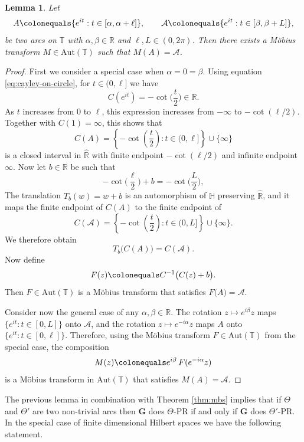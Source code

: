 \documentclass[reqno,a4paper,11pt]{amsart}
\numberwithin{equation}{section}
\newtheorem{lemma}[definition]{Lemma}
\def\R{{\mathbb R}}
\def\T{{\mathbb T}}
\newcommand\1{\mathds{1}}
\begin{document}
\begin{lemma}\label{lma:arc_bijection}
    Let
    $$
      A \colonequals \{ e^{it} : t \in [\alpha, \alpha + \ell] \}, 
      \qquad 
      \mathcal{A} \colonequals \{ e^{it} : t \in [\beta, \beta + L] \},
    $$
    be two arcs on $\T$ with $\alpha,\beta \in \R$ and $\ell,L \in (0,2\pi)$. Then there exists a Möbius transform $M\in\mathrm{Aut}(\T)$ such that $M(A)=\mathcal{A}$.
\end{lemma}
\begin{proof}
First we consider a special case when $\alpha=0=\beta$.
Using equation \eqref{eq:cayley-on-circle}, for $t\in(0,\ell]$ we have
$$
  C(e^{it}) = -\cot\Big(\frac{t}{2}\Big) \in \R.
$$
As $t$ increases from $0$ to $\ell$, this expression increases from $-\infty$ to $-\cot(\ell/2)$. Together with $C(1)=\infty$, this shows that
$$
  C(A)
  = \left \{ -\cot\left (\frac{t}{2} \right ) : t\in(0,\ell] \right \} \cup \{\infty\}
$$
is a closed interval in $\hat \R$ with finite endpoint $-\cot(\ell/2)$ and infinite endpoint $\infty$.
Now let $b\in\R$ be such that
$$
  -\cot\Big(\frac{\ell}{2}\Big) + b = -\cot\Big(\frac{L}{2}\Big),
$$
The translation $T_b(w) = w + b$ is an automorphism of $\mathbb H$ preserving $\hat \R$, and it maps the finite endpoint of $C(A)$ to the finite endpoint of
$$
  C(\mathcal{A})
  = \left \{ -\cot\left (\frac{t}{2} \right ) : t\in(0,L] \right \} \cup \{\infty\}.
$$
We therefore obtain
$$
  T_b\bigl(C(A)\bigr)
  = C(\mathcal{A}).
$$
Now define
$$
  F(z) \colonequals C^{-1}\bigl(C(z) + b\bigr).
$$
Then $F\in \text{Aut}(\T)$ is a Möbius transform that satisfies $F\bigl(A\bigr)=\mathcal{A}$.

Consider now the general case of any $\alpha,\beta\in \R$. The rotation $z\mapsto e^{i\beta}z$ maps $\{e^{it}:t\in[0,L]\}$ onto $\mathcal A$, and the rotation $z\mapsto e^{-i\alpha}z$ maps $A$ onto $\{e^{it}: t\in [0,\ell]\}$. Therefore, using the Möbius transform $F\in \text{Aut}(\T)$ from the special case, the composition
$$
  M(z) \colonequals e^{i\beta}\,F(e^{-i\alpha}z)
$$
is a Möbius transform in $\mathrm{Aut}(\T)$ that satisfies
$
  M(A) = \mathcal A.
$
\end{proof}

The previous lemma in combination with Theorem \ref{thm:mbs} implies that if $\Theta$ and $\Theta'$ are two non-trivial arcs then $\mathbf{G}$ does $\Theta$-PR if and only if $\mathbf{G}$ does $\Theta'$-PR. In the special case of finite dimensional Hilbert spaces we have the following statement.
\end{document}
